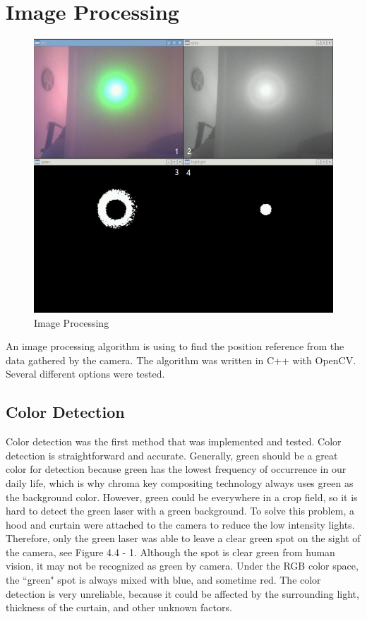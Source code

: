 \section{Image Processing}
\begin{figure}[ht!]
\begin{center}
\includegraphics[scale = 0.7]{pics/imaging.jpg}
\caption{Image Processing}
\end{center}
\end{figure}
An image processing algorithm is using to find the position reference from the data gathered by the camera. The algorithm was written in C++ with OpenCV. Several different options were tested.

\subsection{Color Detection}

Color detection was the first method that was implemented and tested. Color detection is straightforward and accurate. Generally, green should be a great color for detection because green has the lowest frequency of occurrence in our daily life, which is why chroma key compositing technology always uses green as the background color. However, green could be everywhere in a crop field, so it is hard to detect the green laser with a green background. To solve this problem, a hood and curtain were attached to the camera to reduce the low intensity lights. Therefore, only the green laser was able to leave a clear green spot on the sight of the camera, see Figure 4.4 - 1. Although the spot is clear green from human vision, it may not be recognized as green by camera. Under the RGB color space, the ``green" spot is always mixed with blue, and sometime red. The color detection is very unreliable, because it could be affected by the surrounding light, thickness of the curtain, and other unknown factors.
